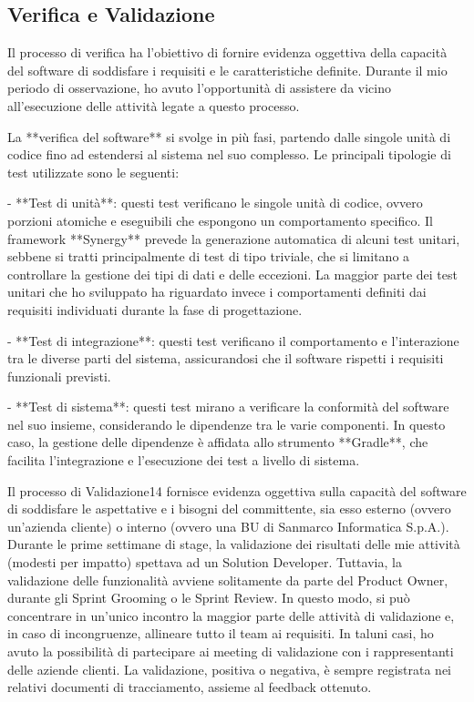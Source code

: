         
        \subsection{Verifica e Validazione}
        Il processo di verifica ha l’obiettivo di fornire evidenza oggettiva della capacità del software di soddisfare i requisiti e le caratteristiche definite. Durante il mio periodo di osservazione, ho avuto l'opportunità di assistere da vicino all'esecuzione delle attività legate a questo processo.

La **verifica del software** si svolge in più fasi, partendo dalle singole unità di codice fino ad estendersi al sistema nel suo complesso. Le principali tipologie di test utilizzate sono le seguenti:

- **Test di unità**: questi test verificano le singole unità di codice, ovvero porzioni atomiche e eseguibili che espongono un comportamento specifico. Il framework **Synergy** prevede la generazione automatica di alcuni test unitari, sebbene si tratti principalmente di test di tipo triviale, che si limitano a controllare la gestione dei tipi di dati e delle eccezioni. La maggior parte dei test unitari che ho sviluppato ha riguardato invece i comportamenti definiti dai requisiti individuati durante la fase di progettazione.

- **Test di integrazione**: questi test verificano il comportamento e l'interazione tra le diverse parti del sistema, assicurandosi che il software rispetti i requisiti funzionali previsti.

- **Test di sistema**: questi test mirano a verificare la conformità del software nel suo insieme, considerando le dipendenze tra le varie componenti. In questo caso, la gestione delle dipendenze è affidata allo strumento **Gradle**, che facilita l’integrazione e l’esecuzione dei test a livello di sistema.

Il processo di Validazione14 fornisce evidenza oggettiva sulla capacità del software di soddisfare le aspettative e i bisogni del committente, sia esso esterno (ovvero un’azienda cliente) o interno (ovvero una BU di Sanmarco Informatica S.p.A.).
Durante le prime settimane di stage, la validazione dei risultati delle mie attività (modesti per impatto) spettava ad un Solution Developer.
 Tuttavia, la validazione delle funzionalità avviene solitamente da parte del Product Owner, durante gli Sprint Grooming o le Sprint Review. In questo modo, si può concentrare in un’unico incontro la maggior parte delle attività di validazione e, in caso di incongruenze, allineare tutto il team ai requisiti.
In taluni casi, ho avuto la possibilità di partecipare ai meeting di validazione con i rappresentanti delle aziende clienti.
La validazione, positiva o negativa, è sempre registrata nei relativi documenti di tracciamento, assieme al feedback ottenuto.

